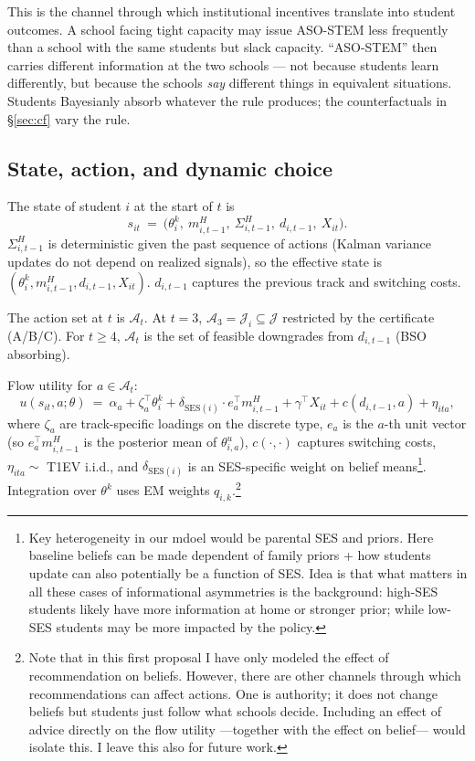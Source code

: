\documentclass{article}
\begin{document}
This is the channel through which institutional incentives translate into 
student outcomes. A school facing tight capacity may issue ASO-STEM less 
frequently than a school with the same students but slack capacity. ``ASO-STEM'' 
then carries different information at the two schools --- not because students 
learn differently, but because the schools \emph{say} different things in 
equivalent situations. Students Bayesianly absorb whatever the rule produces; 
the counterfactuals in \S\ref{sec:cf} vary the rule.

\subsection{State, action, and dynamic choice}

The state of student $i$ at the start of $t$ is
\begin{equation}
  s_{it} \ =\ \big(\theta^k_i,\ m^H_{i,t-1},\ \Sigma^H_{i,t-1},\ d_{i,t-1},\ X_{it}\big).
  \label{eq:state}
\end{equation}
$\Sigma^H_{i,t-1}$ is deterministic given the past sequence of actions (Kalman variance updates do not depend on realized signals), so the effective state is $(\theta^k_i, m^H_{i,t-1}, d_{i,t-1}, X_{it})$. $d_{i,t-1}$ captures the previous track and switching costs.

The action set at $t$ is $\mathcal{A}_t$. At $t=3$, $\mathcal{A}_3 = \mathcal{J}_i \subseteq \mathcal{J}$ restricted by the certificate (A/B/C). For $t \geq 4$, $\mathcal{A}_t$ is the set of feasible downgrades from $d_{i,t-1}$ (BSO absorbing).

Flow utility for $a \in \mathcal{A}_t$:
\begin{equation}
  u(s_{it}, a; \theta) \ =\ \alpha_a + \zeta_a^\top \theta^k_i + \delta_{\mathrm{SES}(i)} \cdot e_a^\top m^H_{i,t-1} + \gamma^\top X_{it} + c(d_{i,t-1}, a) + \eta_{ita},
  \label{eq:flow}
\end{equation}
where $\zeta_a$ are track-specific loadings on the discrete type, $e_a$ is the $a$-th unit vector (so $e_a^\top m^H_{i,t-1}$ is the posterior mean of $\theta^u_{i,a}$), $c(\cdot, \cdot)$ captures switching costs, $\eta_{ita} \sim$ T1EV i.i.d., and $\delta_{\mathrm{SES}(i)}$ is an SES-specific weight on belief means\footnote{Key heterogeneity in our mdoel would be parental SES and priors. Here baseline beliefs can be made dependent of family priors + how students update can also potentially be a function of SES. Idea is that what matters in all these cases of informational asymmetries is the background: high-SES students likely have more information at home or stronger prior; while low-SES students may be more impacted by the policy.}. Integration over $\theta^k$ uses EM weights $q_{i,k}$.\footnote{Note that in this first proposal I have only modeled the effect of recommendation on beliefs. However, there are other channels through which recommendations can affect actions. One is authority; it does not change beliefs but students just follow what schools decide. Including an effect of advice directly on the flow utility ---together with the effect on belief--- would isolate this. I leave this also for future work.}
\end{document}
